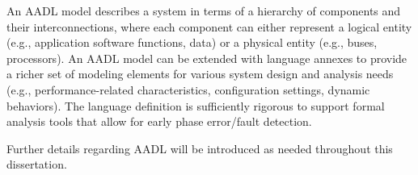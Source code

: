 An AADL model describes a system in terms of a hierarchy of components and their interconnections, where each component can either represent a logical entity (e.g., application software functions, data) or a physical entity (e.g., buses, processors). An AADL model can be extended with language annexes to provide a richer set of modeling elements for various system design and analysis needs (e.g., performance-related characteristics, configuration settings, dynamic behaviors). The language definition is sufficiently rigorous to support formal analysis tools that allow for early phase error/fault detection. 

Further details regarding AADL will be introduced as needed throughout this dissertation. 